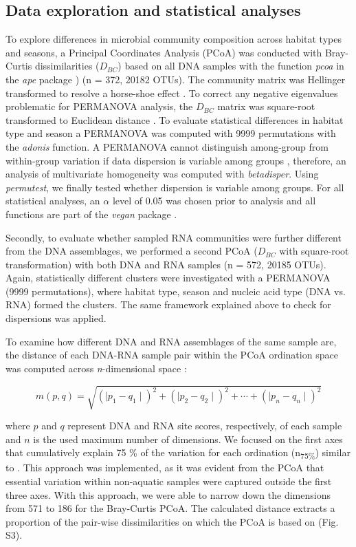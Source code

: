 \documentclass[12pt,a4paper]{article} %
\begin{document}
\subsection*{Data exploration and statistical analyses}
To explore differences in microbial community composition across habitat types and seasons, a Principal Coordinates Analysis (PCoA) was conducted with Bray-Curtis dissimilarities ($D_{BC}$) \citep{Bray1957, Legendre1998} based on all DNA samples with the function \textit{pcoa} in the \textit{ape} package \citep{Paradis2018}) (n = 372, 20182 OTUs). The community matrix was Hellinger transformed to resolve a horse-shoe effect \citep{Legendre2001}. To correct any negative eigenvalues problematic for PERMANOVA analysis, the $D_{BC}$ matrix was square-root transformed to Euclidean distance \citep{Legendre1998, Borcard2011}. To evaluate statistical differences in habitat type and season a PERMANOVA was computed with 9999 permutations with the \textit{adonis} function. A PERMANOVA cannot distinguish among-group from within-group variation if data dispersion is variable among groups \citep{Anderson2013}, therefore, an analysis of multivariate homogeneity was computed with \textit{betadisper}. Using \textit{permutest}, we finally tested whether dispersion is variable among groups. For all statistical analyses, an $\alpha$ level of 0.05 was chosen prior to analysis and all functions are part of the \textit{vegan} package \citep{Oksanen2017}.

Secondly, to evaluate whether sampled RNA communities were further different from the DNA assemblages, we performed a second PCoA ($D_{BC}$ with square-root transformation) with both DNA and RNA samples (n = 572, 20185 OTUs). Again, statistically different clusters were investigated with a PERMANOVA (9999 permutations), where habitat type, season and nucleic acid type (DNA vs. RNA) formed the clusters. The same framework explained above to check for dispersions was applied.

To examine how different DNA and RNA assemblages of the same sample are, the distance of each DNA-RNA sample pair within the PCoA ordination space was computed across \textit{n}-dimensional space \citep{Tabak2004}:


\[ m(p,q) = \sqrt{(\mid p_{1} - q_{1} \mid)^2 + (\mid p_{2} - q_{2} \mid)^2 + \cdots + (\mid p_{n} - q_{n} \mid)^2}\]


where $p$ and $q$ represent DNA and RNA site scores, respectively, of each sample and $n$ is the used maximum number of dimensions. We focused on the first axes that cumulatively explain 75 \% of the variation for each ordination (n\textsubscript{75\%}) similar to \citet{Osterholz2016}. This approach was implemented, as it was evident from the PCoA that essential variation within non-aquatic samples were captured outside the first three axes. With this approach, we were able to narrow down the dimensions from 571 to 186 for the Bray-Curtis PCoA. The calculated distance extracts a proportion of the pair-wise dissimilarities on which the PCoA is based on (Fig. S3).
\end{document}
